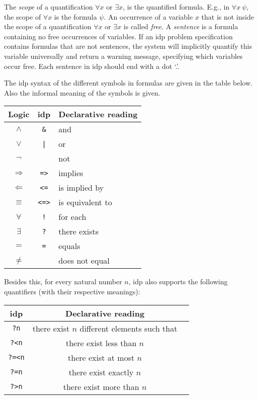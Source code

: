 \documentclass[a4]{article}
\newcommand{\idp}{{\sc idp}\xspace}
\newcommand{\code}[1]{{\tt #1}}
\newcommand{\lir}{\Rightarrow}
\newcommand{\ril}{\Leftarrow}
\begin{document}
The \emph{scope} of a quantification $\forall x$ or $\exists x$, is the quantified formula. E.g., in $\forall x\ \psi$, the scope of $\forall x$ is the formula $\psi$. An occurrence of a variable $x$ that is not inside the scope of a quantification $\forall x$ or $\exists x$ is called \emph{free}. A \emph{sentence} is a formula containing no free occurrences of variables. If an \idp problem specification contains formulas that are not sentences, the system will implicitly quantify this variable universally and return a warning message, specifying which variables occur free. Each sentence in \idp should end with a dot `.'.

The \idp syntax of the different symbols in formulas are given in the table below. Also the informal meaning of the symbols is given.
\begin{center}
\begin{tabular}{c|c|l}
Logic & \idp & Declarative reading \\
\hline
$\wedge$		& {\tt \&}	& and \\
$\vee$		& {\tt |}	& or	\\
$\neg$		& \verb1~1	& not \\
$\lir$		& {\tt =>}	& implies \\
$\ril$		& {\tt <=}	& is implied by \\
$\equiv$		& {\tt <=>}	& is equivalent to \\
$\forall$	& {\tt !}	& for each \\
$\exists$	& {\tt ?}	& there exists \\
$=$			& {\tt =}	& equals \\
$\neq$		& \verb1~=1	& does not equal \\ 
\end{tabular}
\end{center}

Besides this, for every natural number $n$, \idp also supports the following quantifiers (with their respective meanings):

\begin{center}
\begin{tabular}{c|c|l}
\idp & Declarative reading \\
\hline
\code{?n}	& there exist $n$ different elements such that \\
\code{?<n} & there exist less than $n$ \\
\code{?=<n} & there exist at most $n$\\
\code{?=n} & there exist exactly $n$\\
\code{?>n} & there exist more than $n$
\end{tabular}
\end{center}
\end{document}
